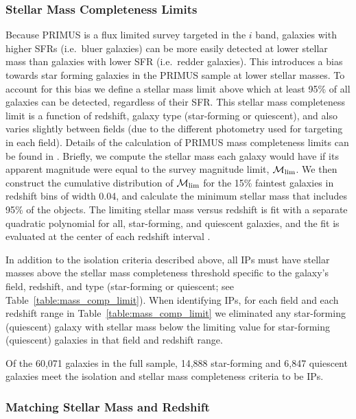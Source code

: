 \subsubsection{Stellar Mass Completeness Limits}\label{sec:mass_limit}

Because PRIMUS is a flux limited survey targeted in the $i$ band, galaxies with higher SFRs (i.e.~bluer galaxies) can be more easily detected at lower stellar mass than galaxies with lower SFR (i.e.~redder galaxies).
This introduces a bias towards star forming galaxies in the PRIMUS sample at lower stellar masses.
To account for this bias we define a stellar mass limit above which at least 95\% of all galaxies can be detected, regardless of their SFR.
This stellar mass completeness limit is a function of redshift, galaxy type (star-forming or quiescent), and also varies slightly between fields (due to the different photometry used for targeting in each field).
Details of the calculation of PRIMUS mass completeness limits can be found in \citet{Moustakas13}.
Briefly, we compute the stellar mass each galaxy would have if its apparent magnitude were equal to the survey magnitude limit, $\mlim$.  We then construct the cumulative distribution of $\mlim$ for the 15\% faintest galaxies in redshift bins of width 0.04, and calculate the minimum stellar mass that includes 95\% of the objects.  The limiting stellar mass versus redshift is fit with a separate quadratic polynomial for all, star-forming, and quiescent galaxies, and the fit is evaluated at the center of each redshift interval \citep[see][]{Moustakas13}.

In addition to the isolation criteria described above, all IPs must have stellar masses above the stellar mass completeness threshold specific to the galaxy's field, redshift, and type (star-forming or quiescent; see Table~\ref{table:mass_comp_limit}).  When identifying IPs, for each field and each redshift range in Table~\ref{table:mass_comp_limit} we eliminated any star-forming (quiescent) galaxy with stellar mass below the limiting value for star-forming (quiescent) galaxies in that field and redshift range.

Of the 60,071 galaxies in the full sample, 14,888 star-forming and 6,847 quiescent galaxies meet the isolation and stellar mass completeness criteria to be IPs.



\subsubsection{Matching Stellar Mass and Redshift}\label{sec:IPsample_matching}

